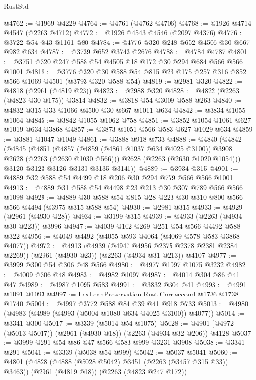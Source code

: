\begin{lexlean}{RustStd}
\begin{coremodule}
{\begin{coremodule}
{{{{{{{{{{{{{{{@4762 := @1969 @4229
@4764 := @4761 (@4762 @4706)
@4768 := @1926 @4714 @4547 (@2263 @4712)
@4772 := @1926 @4543 @4546 (@2097 @4376)
@4776 := @3722 @54 @43 @1161 @80
@4784 := @4776 @320 @248 @652 @4506 @30 @667 @982 @634
@4787 := @3739 @652 @3743 @2676
@4788 := @4784 @4787
@4801 := @3751 @320 @247 @588 @54 @4505 @18 @172 @30 @294 @684 @566 @566 @1001
@4818 := @3776 @320 @30 @588 @54 @815 @23 @175 @257 @316 @852 @566 @1069 @4501 (@3793 @320 @588 @54)
@4819 := @2981 @320
@4822 := @4818 (@2961 (@4819 @23))
@4823 := @2988 @320
@4828 := @4822 (@2263 (@4823 @30 @175)) @3814
@4832 := @3818 @54 @3009 @588 @263
@4840 := @4832 @315 @33 @1066 @4500 @30 @667 @1011 @634
@4842 := @3834 @1055 @1064
@4845 := @3842 @1055 @1062 @758
@4851 := @3852 @1054 @1061 @627 @1019 @634 @3868
@4857 := @3873 @1051 @566 @583 @627 @1029 @634
@4859 := @3881 @1047 @1049
@4861 := @3888 @918 @733
@4888 := @4840
    (@4842
      (@4845
        (@4851
          (@4857 (@4859 (@4861 @1037 @634 @4025 @3100)) @3908 @2628 (@2263 (@2630 @1030 @566)))
          @2628
          (@2263 (@2630 @1020 @1054)))
        @3120
        @3123
        @3126
        @3130
        @3135
        @3141))
@4889 := @3934 @315
@4901 := @4889 @32 @588 @54 @4499 @18 @206 @30 @294 @779 @566 @566 @1001
@4913 := @4889 @31 @588 @54 @4498 @23 @213 @30 @307 @789 @566 @566 @1098
@4929 := @4889 @30 @588 @54 @815 @28 @223 @30 @310 @800 @566 @566 @4494 (@3975 @315 @588 @54)
@4930 := @2981 @315
@4933 := @4929 (@2961 (@4930 @28))
@4934 := @3199 @315
@4939 := @4933 (@2263 (@4934 @30 @223)) @3996
@4947 := @4039 @102 @269 @251 @54 @566 @4492 @588 @322
@4956 := @4049 @4492 (@4055 @593 @4064 (@4069 @578 @583 @3868 @4077))
@4972 := @4913
    (@4939 (@4947 @4956 @2375 @2378 @2381 @2384 @2269))
    (@2961 (@4930 @23))
    (@2263 (@4934 @31 @213))
    @4107
@4977 := @3999 @300 @54 @306 @48 @566
@4980 := @4977 @1097 @1075 @3232
@4982 := @4009 @306 @48
@4983 := @4982 @1097
@4987 := @4014 @304 @86 @41 @47
@4989 := @4987 @1095 @583
@4991 := @3832 @304 @41
@4993 := @4991 @1091 @1093
@4997 := LexLeanPreservation.Rust.Corr.second @1736 @1738 @1740
@5004 := @4997 @3772 @588 @84 @39 @41 @918 @733
@5013 := @4980 (@4983 (@4989 (@4993 (@5004 @1080 @634 @4025 @3100)) @4077))
@5014 := @3341 @300
@5017 := @3339 (@5014 @54 @1075)
@5028 := @4901 (@4972 (@5013 @5017)) (@2961 (@4930 @18)) (@2263 (@4934 @32 @206)) @4128
@5037 := @3999 @291 @54 @86 @47 @566 @583 @999 @3231 @3908
@5038 := @3341 @291
@5041 := @3339 (@5038 @54 @999)
@5042 := @5037 @5041
@5060 := @4801
    (@4828 (@4888 (@5028 @5042) @3451 (@2263 (@3457 @315 @33)) @3463))
    (@2961 (@4819 @18))
    (@2263 (@4823 @247 @172))
}}}}}}}}}}}}}}}
\end{coremodule}}
\end{coremodule}
\end{lexlean}

